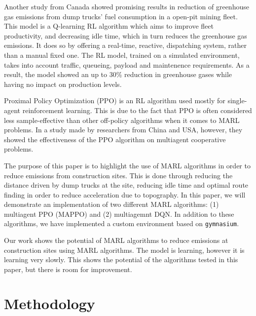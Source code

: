 \documentclass[conference]{IEEEtran}
\begin{document}
Another study from Canada \cite{HUO2023106664} showed promising results in reduction of greenhouse gas
emissions
from dump trucks' fuel consumption in a open-pit mining fleet. This model is a Q-learning RL algorithm
which aims to improve fleet productivity, and decreasing idle time, which in turn reduces the greenhouse
gas emissions. It does so by offering a real-time, reactive,  dispatching system, rather than a manual
fixed one. The RL model, trained on a simulated environment, takes into account traffic, queueing,
payload and maintenence requirements. As a result, the model showed an up to 30\% reduction in greenhouse
gases while having no impact on production levels.



Proximal Policy Optimization (PPO) is an RL algorithm used mostly for single-agent reinforcement learning.
This is due to the fact that PPO is often considered less sample-effective than other off-policy algorithms
when it comes to MARL problems. In a study made by researchers from China and USA, however, they showed the
effectiveness of the PPO algorithm on multiagent cooperative problems. \cite{yu2022surprising}


The purpose of this paper is to highlight the use of MARL algorithms in order to reduce \coo emissions
from construction sites. This is done through reducing the distance driven by dump trucks at the site,
reducing idle time and optimal route finding in order to reduce acceleration due to topography. In this
paper, we will demonstrate an implementation of two different MARL algorithms:
(1) multiagent PPO (MAPPO) and (2) multiagemnt DQN. In addition to these algorithms, we have implemented a
custom environment based on \texttt{gymnasium}. \cite{Towers_Gymnasium}

Our work shows the potential of MARL algorithms to reduce emissions at construction sites using MARL
algorithms. The model is learning, however it is learning very slowly. This shows the potential of
the algorithms tested in this paper, but there is room for improvement.


\section{Methodology}
\end{document}
